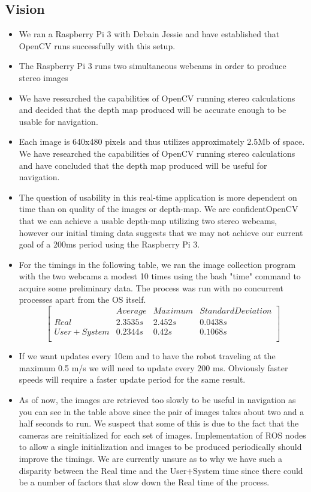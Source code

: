\documentclass[11pt]{amsart}
\begin{document}
\subsection{Vision}  
\begin{itemize}
\item We ran a Raspberry Pi 3 with Debain Jessie and have established that OpenCV runs successfully with this setup.
\item The Raspberry Pi 3 runs two simultaneous webcams in order to produce stereo images
\item We have researched the capabilities of OpenCV running stereo calculations and decided that the depth map produced will be accurate enough to be usable for navigation.
\item Each image is 640x480 pixels and thus utilizes approximately 2.5Mb of space.  We have researched the capabilities of OpenCV running stereo calculations and have concluded that the depth map produced will be useful for navigation.
\item The question of usability in this real-time application is more dependent on time than on quality of the images or depth-map.  We are confidentOpenCV that we can achieve a usable depth-map utilizing two stereo webcams, however our initial timing data suggests that we may not achieve our current goal of a 200ms period using the Raspberry Pi 3.  
\item For the timings in the following table, we ran the image collection program with the two webcams a modest 10 times using the bash "time" command to acquire some preliminary data.  The process was run with no concurrent processes apart from the OS itself.
\[
\begin{bmatrix}
& Average & Maximum & Standard Deviation \\
Real & 2.3535s & 2.452s & 0.0438s \\
User + System & 0.2344s & 0.42s & 0.1068s \\
\end{bmatrix} 
\]
\item If we want updates every 10cm and to have the robot traveling at the maximum 0.5 m/s we will need to update every 200 ms. Obviously faster speeds will require a faster update period for the same result.
\item As of now, the images are retrieved too slowly to be useful in navigation as you can see in the table above since the pair of images takes about two and a half seconds to run.  We suspect that some of this is due to the fact that the cameras are reinitialized for each set of images.  Implementation of ROS nodes to allow a single initialization and images to be produced periodically should improve the timings. We are currently unsure as to why we have such a disparity between the Real time and the User+System time since there could be a number of factors that slow down the Real time of the process.

\end{itemize}
\end{document}
